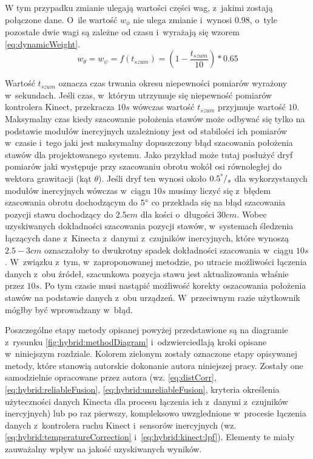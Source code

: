 																
W tym przypadku zmianie ulegają wartości części wag, z~jakimi zostają połączone dane. O~ile wartość $w_\phi$ nie ulega zmianie i~wynosi $0.98$, o~tyle pozostałe dwie wagi są zależne od czasu i~wyrażają się wzorem \ref{eq:dynamicWeight}.
\begin{equation}
	w_{\theta} = w_{\psi} = f(t_{szum}) = (1-\frac{t_{szum}}{10}) * 0.65
	\label{eq:dynamicWeight}
\end{equation}
																
Wartość $t_{szum}$ oznacza czas trwania okresu niepewności pomiarów wyrażony w~sekundach. Jeśli czas, w~którym utrzymuje się niepewność pomiarów kontrolera Kinect, przekracza $10s$ wówczas wartość $t_{szum}$ przyjmuje wartość $10$. Maksymalny czas kiedy szacowanie położenia stawów może odbywać się tylko na podstawie modułów inercyjnych uzależniony jest od stabilości ich pomiarów w~czasie i~tego jaki jest maksymalny dopuszczony błąd szacowania położenia stawów dla projektowanego systemu. Jako przykład może tutaj posłużyć dryf pomiarów jaki występuje przy szacowaniu obrotu wokół osi równoległej do wektora grawitacji (kąt $\theta$). Jeśli dryf ten wynosi około $0.5^\degree/_s$ dla wykorzystanych modułów inercyjnych wówczas w~ciągu $10s$ musimy liczyć się z~błędem szacowania obrotu dochodzącym do $5\degree$ co przekłada się na błąd szacowania pozycji stawu dochodzący do $2.5cm$ dla kości o~długości $30cm$. Wobec uzyskiwanych dokładności szacowania pozycji stawów, w~systemach śledzenia łączących dane z~Kinecta z~danymi z~czujników inercyjnych, które wynoszą $2.5-3cm$ oznaczałoby to dwukrotny spadek dokładności szacowania w~ciągu $10s$. W~związku z~tym, w~zaproponowanej metodzie, po utracie możliwości łączenia danych z~obu źródeł, szacunkowa pozycja stawu jest aktualizowania właśnie przez $10s$. Po tym czasie musi nastąpić możliwość korekty oszacowania położenia stawów na podstawie danych z~obu urządzeń. W~przeciwnym razie użytkownik mógłby być wprowadzany w~błąd. 
											

Poszczególne etapy metody opisanej powyżej przedstawione są na diagramie z~rysunku \ref{fig:hybrid:methodDiagram} i~odzwierciedlają kroki opisane w~niniejszym rozdziale. Kolorem zielonym zostały oznaczone etapy opisywanej metody, które stanowią autorskie dokonanie autora niniejszej pracy. Zostały one samodzielnie opracowane przez autora (wz. \eqref{eq:distCorr}, \eqref{eq:hybrid:reliableFusion}, \eqref{eq:hybrid:unreliableFusion}, kryteria określenia użyteczności danych Kinecta dla procesu łączenia ich z~danymi z~czujników inercyjnych) lub po raz pierwszy, kompleksowo uwzglednione w~procesie łączenia danych z~kontrolera ruchu Kinect i~sensorów inercyjnych (wz. \eqref{eq:hybrid:temperatureCorrection} i~\eqref{eq:hybrid:kinect:lpf}). Elementy te miały zauważalny wpływ na jakość uzyskiwanych wyników.